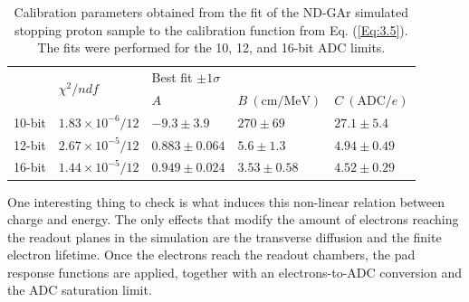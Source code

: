 \begin{table}[t]
	\caption{Calibration parameters obtained from the fit of the ND-GAr simulated stopping proton sample to the calibration function from Eq. (\ref{Eq:3.5}). The fits were performed for the 10, 12, and 16-bit ADC limits.}
	\begin{center}
		\begin{small}
			\begin{tabular}{lllll}
				\cline{2-5}
											& \multirow{2}{*}{$\chi^{2}/ndf$} & \multicolumn{3}{l}{Best fit $\pm 1\sigma$}                              \\ \cline{3-5} 
											&                                 & $A$             & $B~(\mathrm{cm}/\mathrm{MeV})$ & $C~(\mathrm{ADC}/e)$ \\ \hline
				\multicolumn{1}{l|}{10-bit} & $1.83\times10^{-6}/12$          & $-9.3\pm3.9$    & $270\pm69$                     & $27.1\pm5.4$         \\ \hline
				\multicolumn{1}{l|}{12-bit} & $2.67\times10^{-5}/12$          & $0.883\pm0.064$ & $5.6\pm1.3$                    & $4.94\pm0.49$        \\ \hline
				\multicolumn{1}{l|}{16-bit} & $1.44\times10^{-5}/12$          & $0.949\pm0.024$ & $3.53\pm0.58$                  & $4.52\pm0.29$        \\ \hline
			\end{tabular}
		\end{small}
	\end{center}
	\label{tab:calibration_fits}
\end{table}

One interesting thing to check is what induces this non-linear relation between charge and energy. The only effects that modify the amount of electrons reaching the readout planes in the simulation are the transverse diffusion and the finite electron lifetime. Once the electrons reach the readout chambers, the pad response functions are applied, together with an electrons-to-ADC conversion and the ADC saturation limit.

